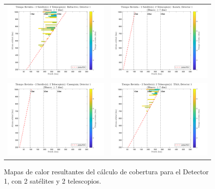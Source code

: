 \begin{landscape}
\begin{figure}[p]
\centering
\vspace*{0.3cm}
\setlength{\tabcolsep}{4pt}
\renewcommand{\arraystretch}{0}
\begin{tabular}{cc}
\includegraphics[width=0.48\linewidth]{4.Payload/Coverage/heatmap_2 Satelite(s); 2 Telescopio(s): Refractivo; Detector 1.jpg} &
\includegraphics[width=0.48\linewidth]{4.Payload/Coverage/heatmap_2 Satelite(s); 2 Telescopio(s): Korsch; Detector 1.jpg} \\
\includegraphics[width=0.48\linewidth]{4.Payload/Coverage/heatmap_2 Satelite(s); 2 Telescopio(s): Cassegrain; Detector 1.jpg} &
\includegraphics[width=0.48\linewidth]{4.Payload/Coverage/heatmap_2 Satelite(s); 2 Telescopio(s): TMA; Detector 1.jpg} \\
\end{tabular}
\caption{Mapas de calor resultantes del cálculo de cobertura para el Detector 1, con 2 satélites y 2 telescopios.}
\end{figure}
\end{landscape}

